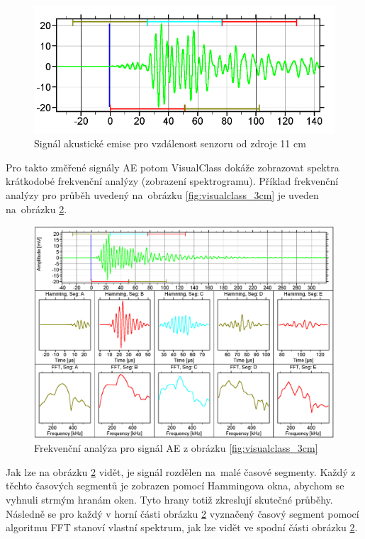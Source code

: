 \begin{figure}[!h]
    \centering
    \includegraphics[width=0.7\linewidth]{obrazky/visualclass_11cm.png}
    \caption{Signál akustické emise pro vzdálenost senzoru od zdroje 11 cm \cite{vallen_visual_class}}
    \label{fig:visualclass_11cm}
\end{figure}
Pro takto změřené signály
 AE potom VisualClass dokáže zobrazovat 
 spektra krátkodobé frekvenční analýzy 
 (zobrazení spektrogramu). 
 Příklad frekvenční analýzy pro průběh uvedený na~obrázku \ref{fig:visualclass_3cm} je uveden na~obrázku \ref{fig:vallen_frekvencni_analyza}. 
\begin{figure}[!h]
    \centering
    \includegraphics[width=0.75\linewidth]{visual_class_spectral_analysis.png}
    \caption{Frekvenční analýza pro signál AE z obrázku \ref{fig:visualclass_3cm} \cite{vallen_visual_class}}
    \label{fig:vallen_frekvencni_analyza}
\end{figure}
Jak lze na obrázku 
\ref{fig:vallen_frekvencni_analyza} vidět, 
je signál rozdělen na~malé časové segmenty. 
Každý z těchto časových segmentů je zobrazen 
pomocí Hammingova okna, abychom se 
vyhnuli strmým hranám oken. 
Tyto hrany totiž zkreslují skutečné průběhy.
Následně se pro každý v horní části
obrázku \ref{fig:vallen_frekvencni_analyza} 
vyznačený časový segment
pomocí algoritmu FFT stanoví vlastní spektrum, 
jak lze vidět ve spodní části obrázku 
\ref{fig:vallen_frekvencni_analyza}.

